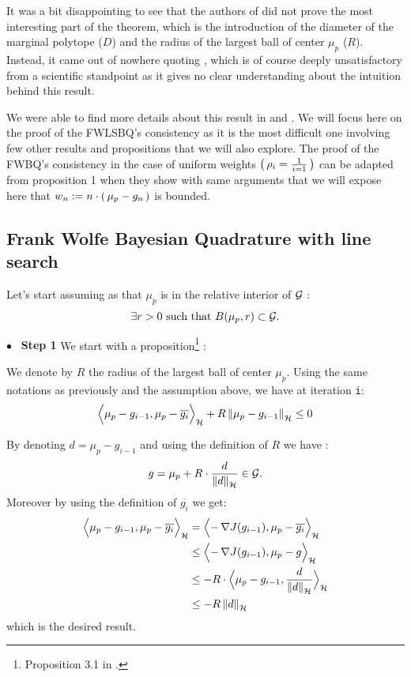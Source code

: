It was a bit disappointing to see that the authors of \cite{FWBQ} did not prove the most interesting part of the theorem,
 which is the introduction of the diameter of the marginal polytope ($D$) and the radius of the largest ball of center $\mu_p$ ($R$). Instead, it came out of nowhere quoting \cite{Bach}, which is of course deeply unsatisfactory from a scientific standpoint
  as it gives no clear understanding about the intuition behind this result.

  We were able to find more details about this result in \cite{Beck} and \cite{Chen}.
  We will focus here on the proof of the FWLSBQ's consistency as it is the most
  difficult one involving few other results and propositions that we will also
  explore. The proof of the FWBQ's consistency in the case of uniform weights $\left( \, \rho_i=\frac{1}{i=1} \, \right)$ can be adapted from \cite{Chen} proposition 1 when they
  show with same arguments that we will expose here that $w_n := n\cdot
  \left( \, \mu_p-g_n \, \right)$ is bounded.

\subsection*{Frank Wolfe Bayesian Quadrature with line search}

Let's start assuming as \cite{Bach} that $\mu_p$ is in the relative interior
of $\mathcal{G}$ :
\begin{equation}
\exists r>0 \text{ such that } B(\mu_p, r) \subset \mathcal{G}.
\end{equation}

{$\bullet$~\normalfont\bfseries\color{myorange!90!black} Step 1 }We start with a proposition\footnote{Proposition 3.1 in \cite{Beck}.} :
\begin{boxtheorem}
  We denote by $R$ the radius of the largest ball of center $\mu_p$.
  Using the same notations as previously and the assumption above, we have at
  iteration \texttt{i}:
  \begin{equation}
    \label{eq:18}
    \Bigps{\mu_p-g_{i-1}}{\mu_p-\overline{g_{i}}}+R \norme{\mu_p-g_{i-1}} \leq 0
  \end{equation}
\end{boxtheorem}

  By denoting $d = \mu_p-g_{i-1}$ and using the definition of $R$ we have :
\begin{equation*}
  g = \mu_p+R\cdot \frac{d}{\norme{d}} \in \G.
\end{equation*}
Moreover by using the definition of $\overline{g_{i}}$ we get:
  \begin{align*}
\Bigps{\mu_p-g_{i-1}}{\mu_p-\overline{g_{i}}} &=
\Bigps{-\grad{J(g_{i-1})}}{\mu_p-\overline{g_{i}}}\\&\leq
\Bigps{-\grad{J(g_{i-1})}}{\mu_p-g}\\
&\leq -R\cdot\Bigps{\mu_p-g_{i-1}}{\frac{d}{\norme{d}}}\\
&\leq -R \norme{d}
  \end{align*}
  which is the desired result.

